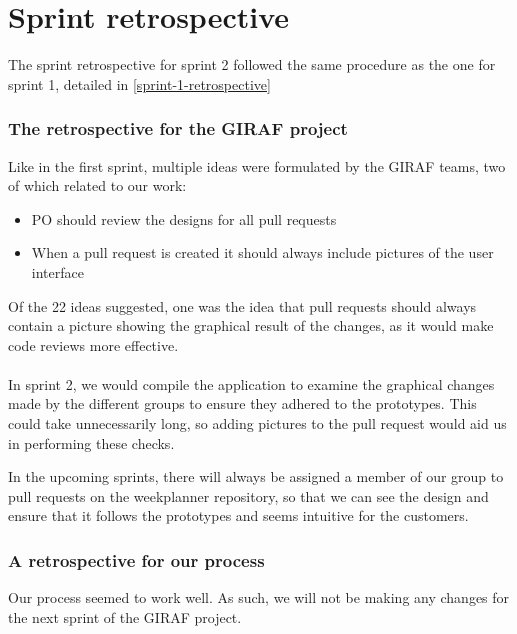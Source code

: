 \section{Sprint retrospective}\label{sec:sprint-2-retrospective}
The sprint retrospective for sprint 2 followed the same procedure as the one for sprint 1, detailed in \autoref{sprint-1-retrospective}

\subsubsection{The retrospective for the GIRAF project}
Like in the first sprint, multiple ideas were formulated by the GIRAF teams, two of which related to our work:
\begin{itemize}
    \item PO should review the designs for all pull requests
    \item When a pull request is created it should always include pictures of the user interface
\end{itemize}
\noindent

Of the 22 ideas suggested, one was the idea that pull requests should always contain a picture showing the graphical result of the changes, as it would make code reviews more effective.
\\\\
In sprint 2, we would compile the application to examine the graphical changes made by the different groups to ensure they adhered to the prototypes.
This could take unnecessarily long, so adding pictures to the pull request would aid us in performing these checks.

In the upcoming sprints, there will always be assigned a member of our group to pull requests on the weekplanner repository, so that we can see the design and ensure that it follows the prototypes and seems intuitive for the customers.

\subsubsection{A retrospective for our process}
Our process seemed to work well.
As such, we will not be making any changes for the next sprint of the GIRAF project.